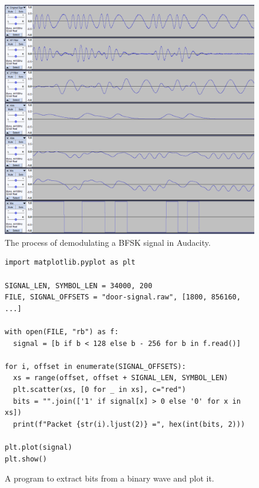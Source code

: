 \begin{figure}[!ht]
    \centering
    \includegraphics[width=\textwidth]{images/6-pentesting/audacity-demodulation.png}
    \caption{The process of demodulating a BFSK signal in Audacity.}
    \label{fig:audacity-demodulation}
\end{figure}
\begin{figure}[ht]
    \begin{verbatim}
import matplotlib.pyplot as plt

SIGNAL_LEN, SYMBOL_LEN = 34000, 200
FILE, SIGNAL_OFFSETS = "door-signal.raw", [1800, 856160, ...]

with open(FILE, "rb") as f:
  signal = [b if b < 128 else b - 256 for b in f.read()]

for i, offset in enumerate(SIGNAL_OFFSETS):
  xs = range(offset, offset + SIGNAL_LEN, SYMBOL_LEN)
  plt.scatter(xs, [0 for _ in xs], c="red")
  bits = "".join(['1' if signal[x] > 0 else '0' for x in xs])
  print(f"Packet {str(i).ljust(2)} =", hex(int(bits, 2)))

plt.plot(signal)
plt.show()
    \end{verbatim}
    \caption{A program to extract bits from a binary wave and plot it.}
    \label{lst:extract-bits}
\end{figure}

